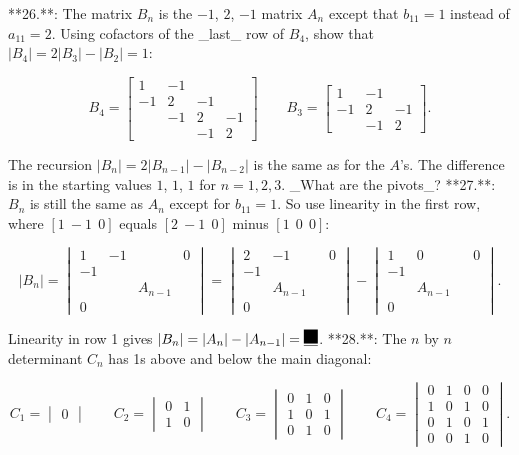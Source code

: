 

**26.**: The matrix \(B_{n}\) is the \(-1\), \(2\), \(-1\) matrix \(A_{n}\) except that \(b_{11}=1\) instead of \(a_{11}=2\). Using cofactors of the _last_ row of \(B_{4}\), show that \(|B_{4}|=2|B_{3}|-|B_{2}|=1\):

\[B_{4}=\begin{bmatrix}1&-1&&\\ -1&2&-1&\\ &-1&2&-1\\ &&-1&2\end{bmatrix}\qquad B_{3}=\begin{bmatrix}1&-1&\\ -1&2&-1\\ &-1&2\end{bmatrix}.\]

The recursion \(|B_{n}|=2|B_{n-1}|-|B_{n-2}|\) is the same as for the \(A\)'s. The difference is in the starting values \(1\), \(1\), \(1\) for \(n=1,2,3\). _What are the pivots_?
**27.**: \(B_{n}\) is still the same as \(A_{n}\) except for \(b_{11}=1\). So use linearity in the first row, where \([1\ -1\ \ 0]\) equals \([2\ -1\ \ 0]\) minus \([1\ \ 0\ \ 0]\):

\[|B_{n}|=\begin{vmatrix}1&-1&&0\\ -1&&&\\ &&A_{n-1}&\\ 0&&&\end{vmatrix}=\begin{vmatrix}2&-1&&0\\ -1&&&\\ &A_{n-1}&\\ 0&&&\end{vmatrix}-\begin{vmatrix}1&0&&0\\ -1&&&\\ &A_{n-1}&\\ 0&&&\end{vmatrix}.\]

Linearity in row 1 gives \(|B_{n}|=|A_{n}|-|A_{n-1}|=\underline{\phantom{\rule{0.0pt}{10.0pt}}\rule{10.0pt} {10.0pt}}\).
**28.**: The \(n\) by \(n\) determinant \(C_{n}\) has 1s above and below the main diagonal:

\[C_{1}=\begin{vmatrix}0\end{vmatrix}\qquad C_{2}=\begin{vmatrix}0&1\\ 1&0\end{vmatrix}\qquad C_{3}=\begin{vmatrix}0&1&0\\ 1&0&1\\ 0&1&0\end{vmatrix}\qquad C_{4}=\begin{vmatrix}0&1&0&0\\ 1&0&1&0\\ 0&1&0&1\\ 0&0&1&0\end{vmatrix}.\]


